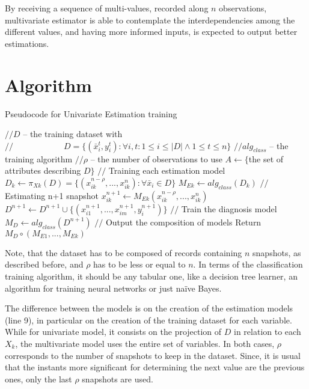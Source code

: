 By receiving a sequence of multi-values, recorded along $n$ observations, multivariate estimator is able to contemplate the interdependencies
 among the different values, and having more informed inputs, is expected to output better estimations.
 
 \section{Algorithm}
 \label{section:algorithm}
 
\begin{algorithm}
\caption{Pseudocode for Univariate Estimation training}
\label{alg:uve}
\begin{algorithmic}[1]
	\State $// D$ – the training dataset with
	\State $// \qquad\qquad\qquad D = \{(\bar{x}_i^t,y_i^t ): \forall i,t:1 \leq i \leq |D| \wedge 1 \leq t \leq n\} $
	\State $// alg_{class}$ – the training algorithm
	\State $// \rho$ – the number of observations to use
    \State $A \leftarrow \{$the set of attributes describing $D\}$
	\Statex
	\State $//$ Training each estimation model
        \State $D_k \leftarrow \pi_{Xk} (D) = \{(x_{ik}^{n-\rho},...,x_{ik}^n ): \forall \bar{x}_i \in D\} $
		\State $M_{Ek} \leftarrow alg_{class}(D_k) $
	\EndFor
	\Statex
	\State $//$ Estimating n+1 snapshot
			\State $x_{ik}^{n+1} \leftarrow M_{Ek} (x_{ik}^{n-\rho},...,x_{ik}^n )$
			\State $ D^{n+1} \leftarrow D^{n+1} \cup \{(x_{i1}^{n+1},...,x_{im}^{n+1},y_i^{n+1} )\}$
		\EndFor
	\EndFor
	\Statex
	\State $//$ Train the diagnosis model
	\State $M_D \leftarrow  alg_{class}(D^{n+1})$
	\Statex
	\State $//$ Output the composition of models
	\State Return $M_D \circ (M_{E1},...,M_{Ek})$
\EndProcedure
\Statex
\end{algorithmic}
\end{algorithm}

Note, that the dataset has to be composed of records containing $n$ snapshots, as described before, and $\rho$ has to be less or equal to $n$. 
In terms of the classification training algorithm, it should be any tabular one, like a decision tree learner, an algorithm for
 training neural networks or just naïve Bayes.

The difference between the models is on the creation of the estimation models (line 9), in particular on the creation of the 
training dataset for each variable. While for univariate model, it consists on the projection of $D$ in relation to each $X_k$, the 
multivariate model uses the entire set of variables. In both cases, $\rho$ corresponds to the number of snapshots to keep in the dataset.
 Since, it is usual that the instants more significant for determining the next value are the previous ones, only the last $\rho$ snapshots are used.

